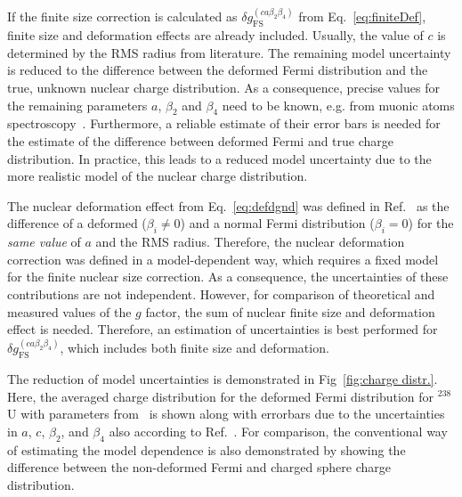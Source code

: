 If the finite size correction is calculated as $\delta g^{(ca\beta_2\beta_4)}_{\text{FS}}$ from Eq.~\eqref{eq:finiteDef}, finite size and deformation effects are already included. Usually, the value of $c$ is determined by the RMS radius from literature. The remaining model uncertainty is reduced to the difference between the deformed Fermi distribution and the true, unknown nuclear charge distribution. As a consequence, precise values for the remaining parameters $a$, $\beta_2$ and $\beta_4$ need to be known, e.g. from muonic atoms spectroscopy~\cite{Close1978,hitlin1970}. Furthermore, a reliable estimate of their error bars is needed for the estimate of the difference between deformed Fermi and true charge distribution. In practice, this leads to a reduced model uncertainty due to the more realistic model of the nuclear charge distribution.

The nuclear deformation effect from Eq.~\eqref{eq:defdgnd} was defined in Ref.~\cite{jacek2012} as the difference of a deformed ($\beta_i \neq 0$) and a normal Fermi distribution ($\beta_i=0$) for the \textit{same value} of $a$ and the RMS radius. 
Therefore, the nuclear deformation correction was defined in a model-dependent way, which requires a fixed model for the finite nuclear size correction. As a consequence, the uncertainties of these contributions are not independent. 
However, for comparison of theoretical and measured values of the $g$ factor, the sum of nuclear finite size and deformation effect is needed. Therefore, an estimation of uncertainties is best performed for $\delta g^{(ca\beta_2\beta_4)}_{\text{FS}}$, which includes both finite size and deformation.
 
The reduction of model uncertainties is demonstrated in Fig~\ref{fig:charge distr.}. Here, the averaged charge distribution for the deformed Fermi distribution for $^{238}$U with parameters from~\cite{jacek2012} is shown along with errorbars due to the uncertainties in $a$, $c$, $\beta_2$, and $\beta_4$ also according to Ref.~\cite{jacek2012}. For comparison, the conventional way of estimating the model dependence is also demonstrated by showing the difference between the non-deformed Fermi and charged sphere charge distribution.

